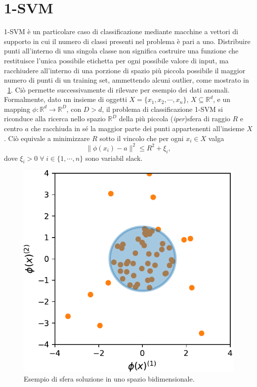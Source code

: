 \documentclass [11pt,a4paper,twoside,openright] {book}
\begin{document}
\section{1-SVM}
1-SVM è un particolare caso di classificazione mediante macchine a vettori di supporto in cui il numero di classi presenti nel problema è pari a uno. Distribuire punti all'interno di una singola classe non significa costruire una funzione che restituisce l'unica possibile etichetta per ogni possibile valore di input, ma racchiudere all'interno di una porzione di spazio più piccola possibile il maggior numero di punti di un training set, ammettendo alcuni outlier, come mostrato in \figurename~\ref{sferasoluzione}. Ciò permette successivamente di rilevare per esempio dei dati anomali. Formalmente, dato un insieme di oggetti $X = \lbrace x_1, x_2, \cdots, x_n \rbrace$, $X \subseteq \mathbb{R}^d$, e un mapping $\phi: \mathbb{R}^d \rightarrow \mathbb{R}^D$, con $D > d$, il problema di classificazione 1-SVM si riconduce alla ricerca nello spazio $\mathbb{R}^D$ della più piccola (\textit{iper})sfera di raggio $R$ e centro $a$ che racchiuda in sé la maggior parte dei punti appartenenti all'insieme $X$. Ciò equivale a minimizzare $R$ sotto il vincolo che per ogni $x_i \in X$ valga
\begin{equation}\label{sfera}
\parallel \phi(x_i) - a \parallel^2 \leq R^2 + \xi_i,
\end{equation}
dove $\xi_i > 0 \; \forall \; i \in \lbrace 1, \cdots, n \rbrace$  sono variabil slack.
\begin{figure}[!b]
\centering
\includegraphics[scale=.55]{figure/fuzzification11.pdf}
\caption{Esempio di sfera soluzione in uno spazio bidimensionale.\label{sferasoluzione}}
\end{figure}
\end{document}
